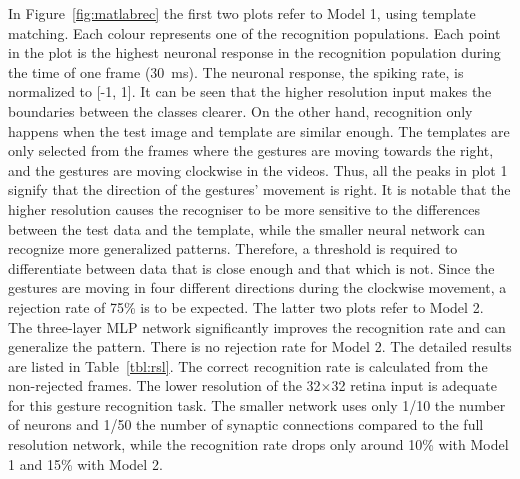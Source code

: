 \documentclass[journal]{journal}
\begin{document}
In Figure~\ref{fig:matlabrec} the first two plots refer to Model 1, using template matching. Each colour represents one of the recognition populations. 
Each point in the plot is the highest neuronal response in the recognition population during the time of one frame (30~ms). 
The neuronal response, the spiking rate, is normalized to [-1, 1]. 
It can be seen that the higher resolution input makes the boundaries between the classes clearer. 
On the other hand, recognition only happens when the test image and template are similar enough. 
The templates are only selected from the frames where the gestures are moving towards the right, and the gestures are moving clockwise in the videos. 
Thus, all the peaks in plot 1 signify that the direction of the gestures’ movement is right.  
It is notable that the higher resolution causes the recogniser to be more sensitive to the differences between the test data and the template, while the smaller neural network can recognize more generalized patterns. 
Therefore, a threshold is required to differentiate between data that is close enough and that which is not. 
Since the gestures are moving in four different directions during the clockwise movement, a rejection rate of 75\% is to be expected. 
The latter two plots refer to Model 2. 
The three-layer MLP network significantly improves the recognition rate and can generalize the pattern. 
There is no rejection rate for Model 2. 
The detailed results are listed in  Table~\ref{tbl:rsl}. 
The correct recognition rate is calculated from the non-rejected frames.
The lower resolution of the 32$\times$32 retina input is adequate for this gesture recognition task. 
The smaller network uses only 1/10 the number of neurons and 1/50 the number of synaptic connections compared to the full resolution network, while the recognition rate drops only around 10\% with Model 1 and 15\% with Model 2.
\end{document}
